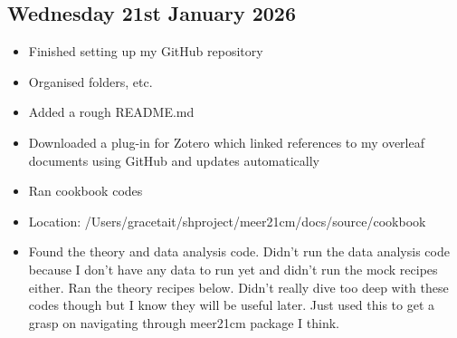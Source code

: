 \subsection{Wednesday 21st January 2026}

\color{black}
\begin{itemize}
\item Finished setting up my GitHub repository
\end{itemize}
\begin{itemize}
            \begin{itemize}
                \item Organised folders, etc.
            \end{itemize}
        \end{itemize}
        \begin{itemize}
            \begin{itemize}
                \item Added a rough README.md
            \end{itemize}
        \end{itemize}
        \begin{itemize}
            \begin{itemize}
                \item Downloaded a plug-in for Zotero which linked references to my overleaf documents using GitHub and updates automatically
            \end{itemize}
        \end{itemize}
\begin{itemize}
    \item Ran cookbook codes
\end{itemize}
    \begin{itemize}
            \item Location: /Users/gracetait/shproject/meer21cm/docs/source/cookbook
        \end{itemize}
    \begin{itemize}
        \begin{itemize}
            \item Found the theory and data analysis code. Didn't run the data analysis code because I don't have any data to run yet and didn't run the mock recipes either. Ran the theory recipes below. Didn't really dive too deep with these codes though but I know they will be useful later. Just used this to get a grasp on navigating through meer21cm package I think.
        \end{itemize}
    \end{itemize}

